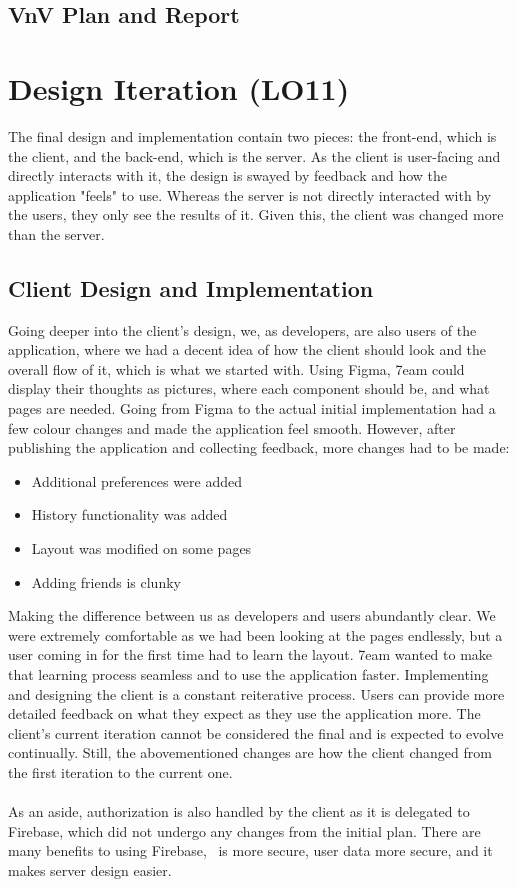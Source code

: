 \documentclass{article}
\begin{document}
\subsection{VnV Plan and Report}

\section{Design Iteration (LO11)}


\noindent The final design and implementation contain two pieces: the front-end, which is the client, and the back-end, which is the server. As the client is user-facing and directly interacts with it, the design is swayed by feedback and how the application "feels" to use. Whereas the server is not directly interacted with by the users, they only see the results of it. Given this, the client was changed more than the server.

\subsection{Client Design and Implementation}
Going deeper into the client's design, we, as developers, are also users of the application, where we had a decent idea of how the client should look and the overall flow of it, which is what we started with. Using Figma, 7eam could display their thoughts as pictures, where each component should be, and what pages are needed. Going from Figma to the actual initial implementation had a few colour changes and made the application feel smooth. However, after publishing the application and collecting feedback, more changes had to be made:
\begin{itemize}
	\item Additional preferences were added
	\item History functionality was added
	\item Layout was modified on some pages
	\item Adding friends is clunky
\end{itemize}
Making the difference between us as developers and users abundantly clear. We were extremely comfortable as we had been looking at the pages endlessly, but a user coming in for the first time had to learn the layout. 7eam wanted to make that learning process seamless and to use the application faster. Implementing and designing the client is a constant reiterative process. Users can provide more detailed feedback on what they expect as they use the application more. The client's current iteration cannot be considered the final and is expected to evolve continually. Still, the abovementioned changes are how the client changed from the first iteration to the current one.
\\~\\ As an aside, authorization is also handled by the client as it is delegated to Firebase, which did not undergo any changes from the initial plan. There are many benefits to using Firebase, \progname ~is more secure, user data more secure, and it makes server design easier.
\end{document}
